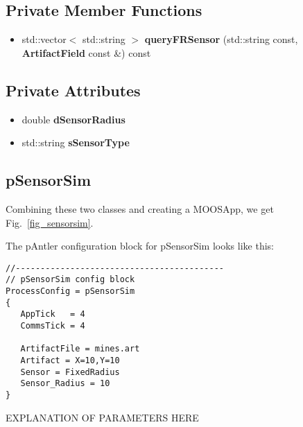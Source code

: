 \subsection*{Private Member Functions}
\begin{itemize}
\item std::vector$<$ std::string $>$ {\bf query\-FRSensor} (std::string const, {\bf Artifact\-Field} const \&) const
\end{itemize}
\subsection*{Private Attributes}
\begin{itemize}
\item double {\bf d\-Sensor\-Radius}
\item std::string {\bf s\-Sensor\-Type}
\end{itemize}

\subsection{pSensorSim}
Combining these two classes and creating a MOOSApp, we get Fig.~\ref{fig_sensorsim}.


The pAntler configuration block for pSensorSim looks like this:
\begin{verbatim}
//------------------------------------------
// pSensorSim config block
ProcessConfig = pSensorSim
{
   AppTick   = 4
   CommsTick = 4
   
   ArtifactFile = mines.art
   Artifact = X=10,Y=10
   Sensor = FixedRadius
   Sensor_Radius = 10   
}
\end{verbatim}

EXPLANATION OF PARAMETERS HERE
